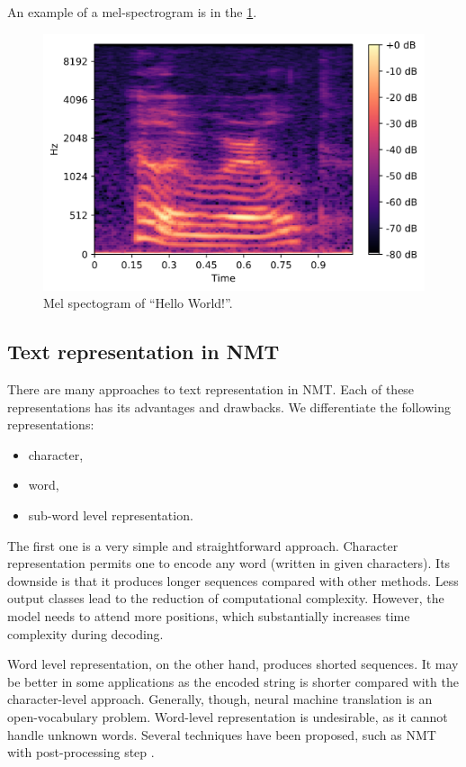 An example of a mel-spectrogram is in the \cref{fig:mel}.

\begin{figure}[h]
	\centering
	\includegraphics[width=0.8\linewidth]{img/mel.png}
	\caption{Mel spectogram of ``Hello World!''.}
	\label{fig:mel}
\end{figure}

\subsection{Text representation in NMT}

There are many approaches to text representation in NMT. Each of these representations has its advantages and drawbacks. We differentiate the following representations:

\begin{itemize}
	\item character,
	\item word,
	\item sub-word level representation.
\end{itemize}

The first one is a very simple and straightforward approach. Character representation permits one to encode any word (written in given characters). Its downside is that it produces longer sequences compared with other methods. Less output classes lead to the reduction of computational complexity. However, the model needs to attend more positions, which substantially increases time complexity during decoding.

Word level representation, on the other hand, produces shorted sequences. It may be better in some applications as the encoded string is shorter compared with the character-level approach. Generally, though, neural machine translation is an open-vocabulary problem. Word-level representation is undesirable, as it cannot handle unknown words. Several techniques have been proposed, such as NMT with post-processing step .

